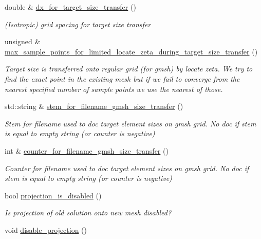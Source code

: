 \begin{DoxyCompactItemize}
double \& \hyperlink{classoomph_1_1GmshParameters_ae5db3c2aca27f73ee53e32178255130d}{dx\+\_\+for\+\_\+target\+\_\+size\+\_\+transfer} ()
\begin{DoxyCompactList}\small\item\em (Isotropic) grid spacing for target size transfer \end{DoxyCompactList}\item 
unsigned \& \hyperlink{classoomph_1_1GmshParameters_a7b7dfff74a8e3183858ecd42b8f1a049}{max\+\_\+sample\+\_\+points\+\_\+for\+\_\+limited\+\_\+locate\+\_\+zeta\+\_\+during\+\_\+target\+\_\+size\+\_\+transfer} ()
\begin{DoxyCompactList}\small\item\em Target size is transferred onto regular grid (for gmsh) by locate zeta. We try to find the exact point in the existing mesh but if we fail to converge from the nearest specified number of sample points we use the nearest of those. \end{DoxyCompactList}\item 
std\+::string \& \hyperlink{classoomph_1_1GmshParameters_a6006bbce01fab0e48e474f077fc926e7}{stem\+\_\+for\+\_\+filename\+\_\+gmsh\+\_\+size\+\_\+transfer} ()
\begin{DoxyCompactList}\small\item\em Stem for filename used to doc target element sizes on gmsh grid. No doc if stem is equal to empty string (or counter is negative) \end{DoxyCompactList}\item 
int \& \hyperlink{classoomph_1_1GmshParameters_acf8155883aab25f0fc13c1eab7c03e9c}{counter\+\_\+for\+\_\+filename\+\_\+gmsh\+\_\+size\+\_\+transfer} ()
\begin{DoxyCompactList}\small\item\em Counter for filename used to doc target element sizes on gmsh grid. No doc if stem is equal to empty string (or counter is negative) \end{DoxyCompactList}\item 
bool \hyperlink{classoomph_1_1GmshParameters_ac8b37d79ebc135382c2320c3ba405a3f}{projection\+\_\+is\+\_\+disabled} ()
\begin{DoxyCompactList}\small\item\em Is projection of old solution onto new mesh disabled? \end{DoxyCompactList}\item 
void \hyperlink{classoomph_1_1GmshParameters_ad9c1ebc0ae01551b7899364a1cf25f19}{disable\+\_\+projection} ()

\end{DoxyCompactItemize}
